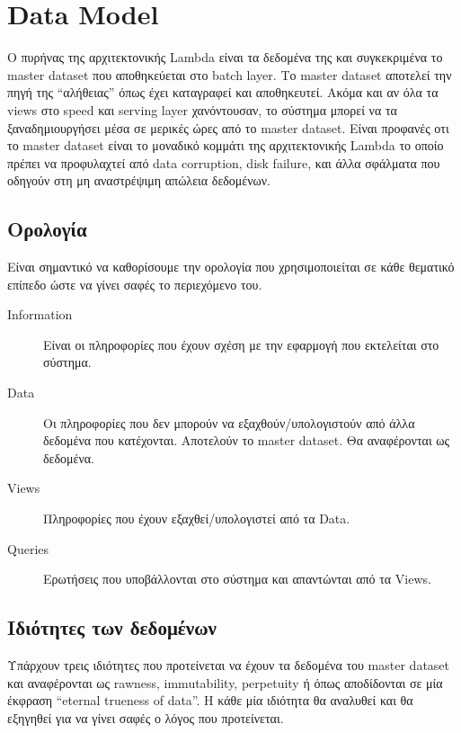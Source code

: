 \thispagestyle{empty}

\chapter{Data Model}


Ο πυρήνας της αρχιτεκτονικής Lambda είναι τα δεδομένα της και συγκεκριμένα το master dataset που αποθηκεύεται στο batch layer. Το master dataset αποτελεί την πηγή της “αλήθειας” όπως έχει καταγραφεί και αποθηκευτεί. Ακόμα και αν όλα τα views στο speed και serving layer χανόντουσαν, το σύστημα μπορεί να τα ξαναδημιουργήσει μέσα σε μερικές ώρες από το master dataset. Είναι προφανές οτι το master dataset είναι το μοναδικό κομμάτι της αρχιτεκτονικής Lambda το οποίο πρέπει να προφυλαχτεί από data corruption, disk failure, και άλλα σφάλματα που οδηγούν στη μη αναστρέψιμη απώλεια δεδομένων.

\vspace{60mm}

\section{Ορολογία}
Είναι σημαντικό να καθορίσουμε την ορολογία που χρησιμοποιείται σε κάθε θεματικό επίπεδο ώστε να γίνει σαφές το περιεχόμενο του.
\begin{description}
\item [Information] Είναι οι πληροφορίες που έχουν σχέση με την εφαρμογή που εκτελείται στο σύστημα.
\item [Data] Οι πληροφορίες που δεν μπορούν να εξαχθούν/υπολογιστούν από   άλλα δεδομένα που κατέχονται. Αποτελούν το master dataset. Θα αναφέρονται ως δεδομένα.
\item [Views] Πληροφορίες που έχουν εξαχθεί/υπολογιστεί από τα Data.
\item [Queries] Ερωτήσεις που υποβάλλονται στο σύστημα και απαντώνται από τα Views.
\end{description}

\section{Ιδιότητες των δεδομένων}
Υπάρχουν τρεις ιδιότητες που προτείνεται να έχουν τα δεδομένα του master dataset και αναφέρονται ως rawness, immutability, perpetuity ή όπως αποδίδονται σε μία έκφραση “eternal trueness of data”. Η κάθε μία ιδιότητα θα αναλυθεί και θα εξηγηθεί για να γίνει σαφές ο λόγος που προτείνεται.
\newline

